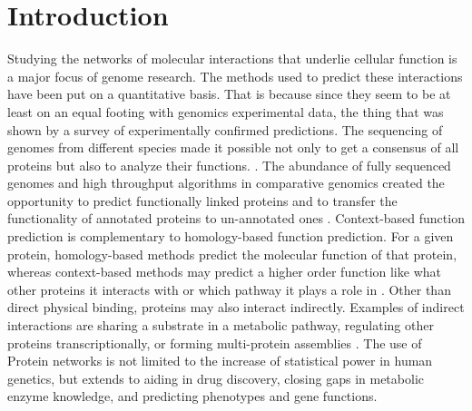\documentclass{ucetd}
\begin{document}
\chapter{Introduction}
Studying the networks of molecular interactions that underlie cellular function is a  major focus of genome research\cite{1}. The methods used to predict these interactions have been put on a quantitative basis. That is because since they seem to be at least on an equal footing with genomics experimental data, the thing that was shown by a survey of experimentally confirmed predictions\cite{4}. The sequencing of genomes from different species made it possible not only to get a consensus of all proteins but also to analyze their functions. \cite{1, 10,11,12,13,14,15}. The abundance of fully sequenced genomes and high throughput algorithms in comparative genomics created the opportunity to predict functionally linked proteins and to transfer the functionality of annotated proteins to un-annotated ones \cite{8}. Context-based function prediction is complementary to homology-based function prediction\cite{5, 17}. For a given protein, homology-based methods predict the molecular function of that protein, whereas context-based methods may predict a higher order function like what other proteins it interacts with or which pathway it plays a role in \cite{5}.  Other than direct physical binding, proteins may also interact indirectly. Examples of indirect interactions are sharing a substrate in a metabolic pathway, regulating other  proteins transcriptionally, or forming multi-protein assemblies \cite{6, 18,19,17}. The use of Protein networks is not limited to the increase of statistical power in human genetics\cite{21,22}, but extends to aiding in drug discovery\cite{23,24}, closing gaps in metabolic enzyme knowledge\cite{25,26}, and predicting phenotypes and gene functions\cite{3, 27,28}. 
\end{document}

